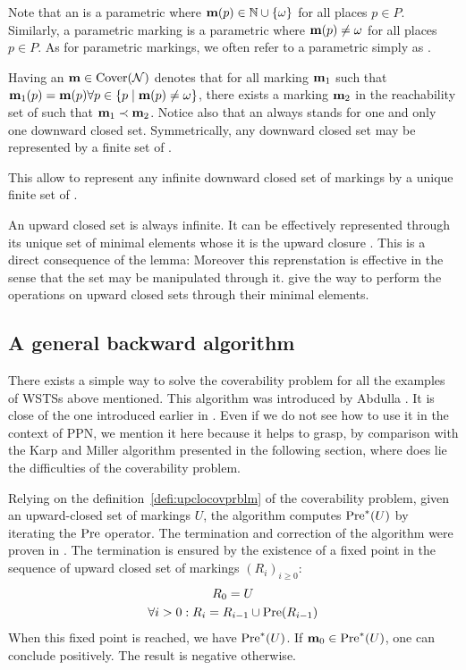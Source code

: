 Note that an \omark \marq is a parametric \omark where $\mathbf{m}(p) \in \mathbb{N} \cup \{\omega\}$ for all places $p \in P$.
Similarly, a parametric marking \marq is a parametric \omark where $\mathbf{m}(p) \neq \omega$ for all places $p \in P$.
As for parametric markings, we often refer to a parametric \omark simply as \omark.

Having an \omark $\mathbf{m} \in \operatorname{Cover}(\mathcal{N})$ denotes that for all marking $\mathbf{m}_1$ such that $\mathbf{m}_1(p) = \mathbf{m}(p) \forall p \in \{p \mid \mathbf{m}(p) \neq \omega\}$, there exists a marking $\mathbf{m}_2$ in the reachability set of \tupleN such that $\mathbf{m}_1 \prec \mathbf{m}_2$.
Notice also that an \omark always stands for one and only one downward closed set.
Symmetrically, any downward closed set may be represented by a finite set of \omarks.  

This allow to represent any infinite downward closed set of markings by a unique finite set of \omarks.

An upward closed set is always infinite.
It can be effectively represented through its unique set of minimal elements whose it is the upward closure .
This is a direct consequence of the  lemma:
Moreover this reprenstation is effective in the sense that the set may be manipulated through it.
 give the way to perform the operations on upward closed sets through their minimal elements.

\subsection{A general backward algorithm}

There exists a simple way to solve the coverability problem for all the examples of \acp{WSTS} above mentioned.
This algorithm was introduced by Abdulla  \citep{Abdulla96}.
It is close of the one introduced earlier in \cite{Finkel90}.
Even if we do not see how to use it in the context of \ac{PPN}, we mention it here because it helps to grasp, by comparison with the Karp and Miller algorithm presented in the following section, where does lie the difficulties of the coverability problem.

Relying on the definition~\ref{defi:upclocovprblm} of the coverability problem, given an upward-closed set of markings $U$, the algorithm computes $\operatorname{Pre}^*(U)$ by iterating the $\operatorname{Pre}$ operator.
The termination and correction of the algorithm were proven in .
The termination is ensured by the existence of a fixed point in the sequence of upward closed set of markings $(R_i)_{i \geq 0}$:
\begin{gather*}
  R_0 = U \\
  \forall i > 0 : R_i = R_{i-1} \cup \operatorname{Pre}(R_{i-1})
\end{gather*}
When this fixed point is reached, we have $\operatorname{Pre}^*(U)$.
If $\mathbf{m}_0 \in \operatorname{Pre}^*(U)$, one can conclude positively.
The result is negative otherwise.

